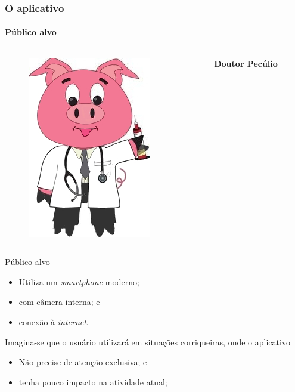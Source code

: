 \documentclass[14pt,beamer]{beamer}
\begin{document}
\begin{frame}
	\frametitle{O aplicativo}
    \framesubtitle{Público alvo}
	
	\vspace{-30px}
	\begin{columns}
		\begin{column}{.3\textwidth}
			\begin{figure}
				\includegraphics[scale=.15]{imagens/docpig}
			\end{figure}
		\end{column}%
		\hfill%
		\begin{column}{9\textwidth}
			\large{\textbf{Doutor Pecúlio}}
		\end{column}%
	\end{columns}
	
    \begin{block}{Público alvo}
        \begin{itemize}
            \item Utiliza um \emph{smartphone} moderno;
            \item com câmera interna; e
            \item conexão à \emph{internet}.
        \end{itemize}
        Imagina-se que o usuário utilizará em situações corriqueiras, 
        onde o aplicativo
        \begin{itemize}
            \item Não precise de atenção exclusiva; e
            \item tenha pouco impacto na atividade atual;
        \end{itemize}
    \end{block}
\end{frame}
\end{document}
